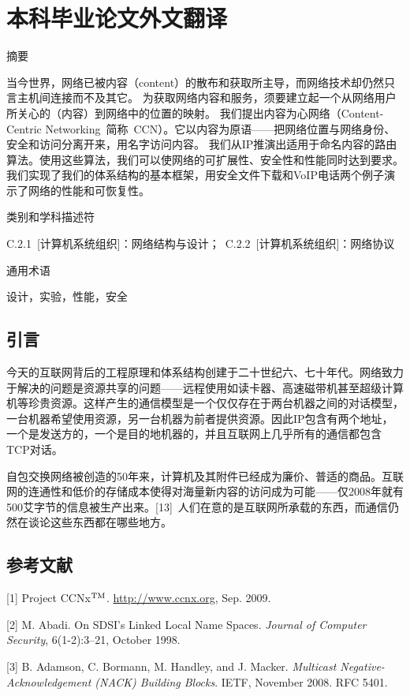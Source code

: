 \chapter{本科毕业论文外文翻译}

\heiti
摘要

\songti
当今世界，网络已被内容（content）的散布和获取所主导，而网络技术却仍然只言主机间连接而不及其它。%
为获取网络内容和服务，须要建立起一个从网络用户所关心的（内容）到网络中的位置的映射。
我们提出内容为心网络（Content-Centric Networking~简称~CCN）。它以内容为原语——把网络位置与网络身份、安全和访问分离开来，用名字访问内容。
我们从IP推演出适用于命名内容的路由算法。使用这些算法，我们可以使网络的可扩展性、安全性和性能同时达到要求。
我们实现了我们的体系结构的基本框架，用安全文件下载和VoIP电话两个例子演示了网络的性能和可恢复性。

\heiti
类别和学科描述符

\songti
C.2.1~[计算机系统组织]：网络结构与设计；~C.2.2~[计算机系统组织]：网络协议

\heiti
通用术语

\songti
设计，实验，性能，安全

\section{引言}
今天的互联网背后的工程原理和体系结构创建于二十世纪六、七十年代。网络致力于解决的问题是资源共享的问题——远程使用如读卡器、高速磁带机甚至超级计算机等珍贵资源。这样产生的通信模型是一个仅仅存在于两台机器之间的对话模型，一台机器希望使用资源，另一台机器为前者提供资源。因此IP包含有两个地址，一个是发送方的，一个是目的地机器的，并且互联网上几乎所有的通信都包含TCP对话。

自包交换网络被创造的50年来，计算机及其附件已经成为廉价、普适的商品。互联网的连通性和低价的存储成本使得对海量新内容的访问成为可能——仅2008年就有500艾字节的信息被生产出来。[13]~人们在意的是互联网所承载的东西，而通信仍然在谈论这些东西都在哪些地方。


\section{参考文献}
\def\tm{\leavevmode\hbox{$\rm {}^{TM}$}} %
[1] Project CCNx\tm. \url{http://www.ccnx.org}, Sep. 2009.

[2] M. Abadi. On SDSI’s Linked Local Name Spaces. \emph{Journal of Computer Security}, 6(1-2):3–21, October 1998.

[3] B. Adamson, C. Bormann, M. Handley, and J. Macker.
\emph{Multicast Negative-Acknowledgement (NACK) Building
Blocks}. IETF, November 2008. RFC 5401.

